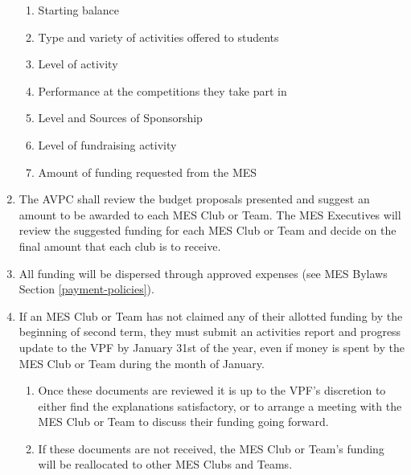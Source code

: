 \begin{enumerate}
  \begin{enumerate}
   \item
    Starting balance
   \item
    Type and variety of activities offered to students
   \item
    Level of activity
   \item
    Performance at the competitions they take part in
   \item
    Level and Sources of Sponsorship
   \item
    Level of fundraising activity
   \item
    Amount of funding requested from the MES
  \end{enumerate}
 \item
  The AVPC shall review the budget proposals presented and suggest an amount to be awarded to each MES Club or Team. The MES Executives will review the suggested funding for each MES Club or Team and decide on the final amount that each club is to receive.
 \item
  All funding will be dispersed through approved expenses (see MES Bylaws Section \ref{payment-policies}). %
 \item
  If an MES Club or Team has not claimed any of their allotted funding by the beginning of second term, they must submit an activities report and progress update to the VPF by January 31st of the year, even if money is spent by the MES Club or Team during the month of January.

  \begin{enumerate}
   \item
    Once these documents are reviewed it is up to the VPF's discretion to either find the explanations satisfactory, or to arrange a meeting with the MES Club or Team to discuss their funding going forward.
   \item
    If these documents are not received, the MES Club or Team's funding will be reallocated to other MES Clubs and Teams.

  \end{enumerate}
\end{enumerate}

